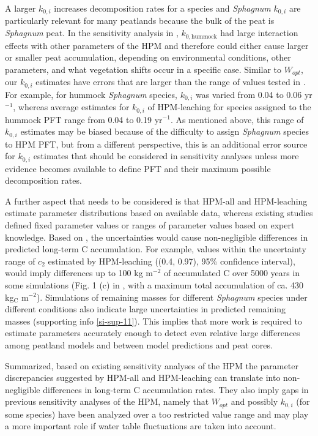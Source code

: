 \documentclass[esd, manuscript]{copernicus}
\begin{document}
A larger \(k_{0,i}\) increases decomposition rates for a species and \emph{Sphagnum} \(k_{0,i}\) are particularly relevant for many peatlands because the bulk of the peat is \emph{Sphagnum} peat. In the sensitivity analysis in \citet{Quillet.2013a}, \(k_{0, \text{hummock}}\) had large interaction effects with other parameters of the HPM and therefore could either cause larger or smaller peat accumulation, depending on environmental conditions, other parameters, and what vegetation shifts occur in a specific case. Similar to \(W_{opt}\), our \(k_{0,i}\) estimates have errors that are larger than the range of values tested in \citet{Quillet.2013a}. For example, for hummock \emph{Sphagnum} species, \(k_{0,i}\) was varied from 0.04 to 0.06 yr\(^{-1}\), whereas average estimates for \(k_{0,i}\) of HPM-leaching for species assigned to the hummock PFT range from 0.04 to 0.19 yr\(^{-1}\). As mentioned above, this range of \(k_{0,i}\) estimates may be biased because of the difficulty to assign \emph{Sphagnum} species to HPM PFT, but from a different perspective, this is an additional error source for \(k_{0,i}\) estimates that should be considered in sensitivity analyses unless more evidence becomes available to define PFT and their maximum possible decomposition rates.

A further aspect that needs to be considered is that HPM-all and HPM-leaching estimate parameter distributions based on available data, whereas existing studies defined fixed parameter values or ranges of parameter values based on expert knowledge. Based on \citet{Quillet.2013}, the uncertainties would cause non-negligible differences in predicted long-term C accumulation. For example, values within the uncertainty range of \(c_2\) estimated by HPM-leaching ((0.4, 0.97), 95\% confidence interval), would imply differences up to 100 kg m\(^{-2}\) of accumulated C over 5000 years in some simulations (Fig. 1 (c) in \citet{Quillet.2013}, with a maximum total accumulation of ca. 430 kg\(_\text{C}\) m\(^{-2}\)). Simulations of remaining masses for different \emph{Sphagnum} species under different conditions also indicate large uncertainties in predicted remaining masses (supporting info \ref{si-sup-11}). This implies that more work is required to estimate parameters accurately enough to detect even relative large differences among peatland models and between model predictions and peat cores.

Summarized, based on existing sensitivity analyses of the HPM the parameter discrepancies suggested by HPM-all and HPM-leaching can translate into non-negligible differences in long-term C accumulation rates. They also imply gaps in previous sensitivity analyses of the HPM, namely that \(W_{opt}\) and possibly \(k_{0,i}\) (for some species) have been analyzed over a too restricted value range and may play a more important role if water table fluctuations are taken into account.
\end{document}

